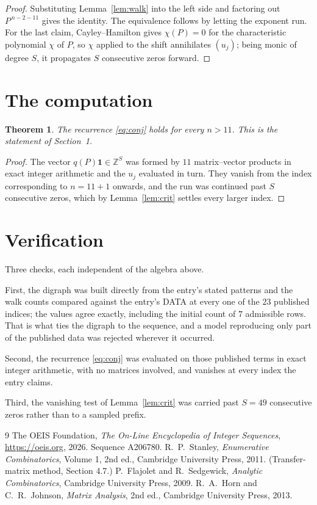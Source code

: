 \documentclass[11pt,a4paper]{article}
\theoremstyle{plain}
\newtheorem{theorem}{Theorem}
\theoremstyle{definition}
\begin{document}
\begin{proof}
Substituting Lemma~\ref{lem:walk} into the left side and factoring out
$P^{\,n-2-11}$ gives the identity. The equivalence follows by letting the exponent
run. For the last claim, Cayley--Hamilton gives $\chi(P)=0$ for the characteristic
polynomial $\chi$ of $P$, so $\chi$ applied to the shift annihilates $(u_j)$; being monic of
degree $S$, it propagates $S$ consecutive zeros forward.
\end{proof}

\section{The computation}

\begin{theorem}
The recurrence \eqref{eq:conj} holds for every $n>11$. This is the statement of
Section~1.
\end{theorem}

\begin{proof}
The vector $q(P)\mathbf{1}\in\mathbb{Z}^{S}$ was formed by $11$ matrix--vector
products in exact integer arithmetic and the $u_j$ evaluated in turn. They vanish from the
index corresponding to $n=11+1$ onwards, and the run was continued past $S$ consecutive
zeros, which by Lemma~\ref{lem:crit} settles every larger index.
\end{proof}

\section{Verification}

Three checks, each independent of the algebra above.

First, the digraph was built directly from the entry's stated patterns and the walk counts
compared against the entry's DATA at every one of the $23$ published indices; the
values agree exactly, including the initial count of $7$ admissible rows. That is
what ties the digraph to the sequence, and a model reproducing only part of the published
data was rejected wherever it occurred.

Second, the recurrence \eqref{eq:conj} was evaluated on those published terms in exact
integer arithmetic, with no matrices involved, and vanishes at every index the entry claims.

Third, the vanishing test of Lemma~\ref{lem:crit} was carried past $S=49$ consecutive
zeros rather than to a sampled prefix.

\begin{thebibliography}{9}
 The OEIS Foundation, \emph{The On-Line Encyclopedia of Integer
Sequences}, \url{https://oeis.org}, 2026. Sequence A206780.
 R.~P.~Stanley, \emph{Enumerative Combinatorics}, Volume 1, 2nd ed.,
Cambridge University Press, 2011. (Transfer-matrix method, Section 4.7.)
 P.~Flajolet and R.~Sedgewick, \emph{Analytic Combinatorics}, Cambridge
University Press, 2009.
 R.~A.~Horn and C.~R.~Johnson, \emph{Matrix Analysis}, 2nd ed., Cambridge
University Press, 2013.
\end{thebibliography}
\end{document}
